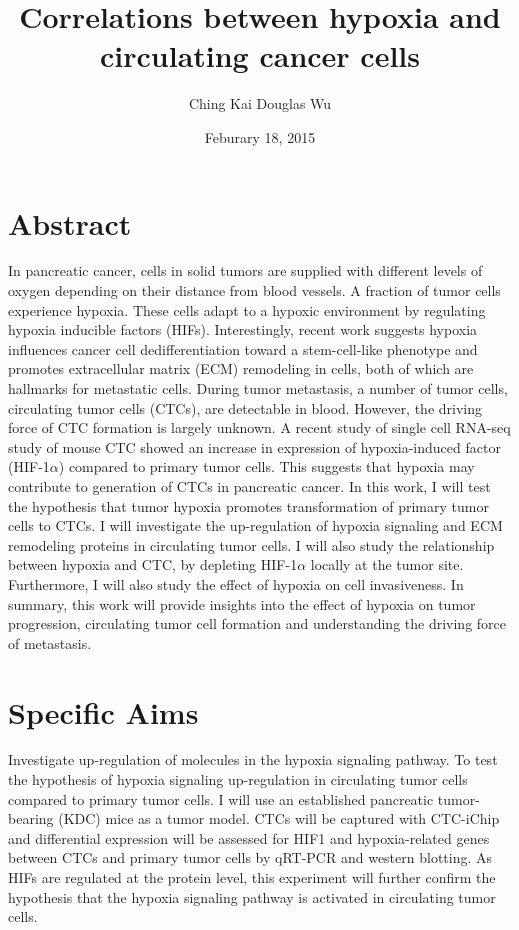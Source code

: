 \documentclass[11pts]{article}
\begin{document}
\vspace{100 mm}
\title{Correlations between hypoxia and circulating cancer cells}
\author{Ching Kai Douglas Wu}
\date{Feburary 18, 2015 } %
\maketitle
\bigskip


\section{Abstract} 
\noindent In pancreatic cancer, cells in solid tumors are supplied with different levels of oxygen depending on their distance from blood vessels. A fraction of tumor cells experience hypoxia. These cells adapt to a hypoxic environment by regulating hypoxia inducible factors (HIFs). Interestingly, recent work suggests hypoxia influences cancer cell dedifferentiation toward a stem-cell-like phenotype and promotes extracellular matrix (ECM) remodeling in cells, both of which are hallmarks for metastatic cells. During tumor metastasis, a number of tumor cells, circulating tumor cells (CTCs), are detectable in blood. However, the driving force of CTC formation is largely unknown. A recent study of single cell RNA-seq study of mouse CTC showed an increase in expression of hypoxia-induced factor (HIF-1$\alpha$) compared to primary tumor cells. This suggests that hypoxia may contribute to generation of CTCs in pancreatic cancer. In this work, I will test the hypothesis that tumor hypoxia promotes transformation of primary tumor cells to CTCs. I will investigate the up-regulation of hypoxia signaling and ECM remodeling proteins in circulating tumor cells. I will also study the relationship between hypoxia and CTC, by depleting HIF-1$\alpha$ locally at the tumor site. Furthermore, I will also study the effect of hypoxia on cell invasiveness. In summary, this work will provide insights into the effect of hypoxia on tumor progression, circulating tumor cell formation and understanding the driving force of metastasis. 
\newpage

\section{Specific Aims}
Investigate up-regulation of molecules in the hypoxia signaling pathway.
\newline
{} To test the hypothesis of hypoxia signaling up-regulation in circulating tumor cells compared to primary tumor cells.
\newline
{} I will use an established pancreatic tumor-bearing (KDC) mice as a tumor model. CTCs will be captured with CTC-iChip and differential expression will be assessed for HIF1 and hypoxia-related genes between CTCs and primary tumor cells by qRT-PCR and western blotting. 
\newline
{} As HIFs are regulated at the protein level, this experiment will further confirm the hypothesis that the hypoxia signaling pathway is activated in circulating tumor cells.
 \newline
\end{document}
